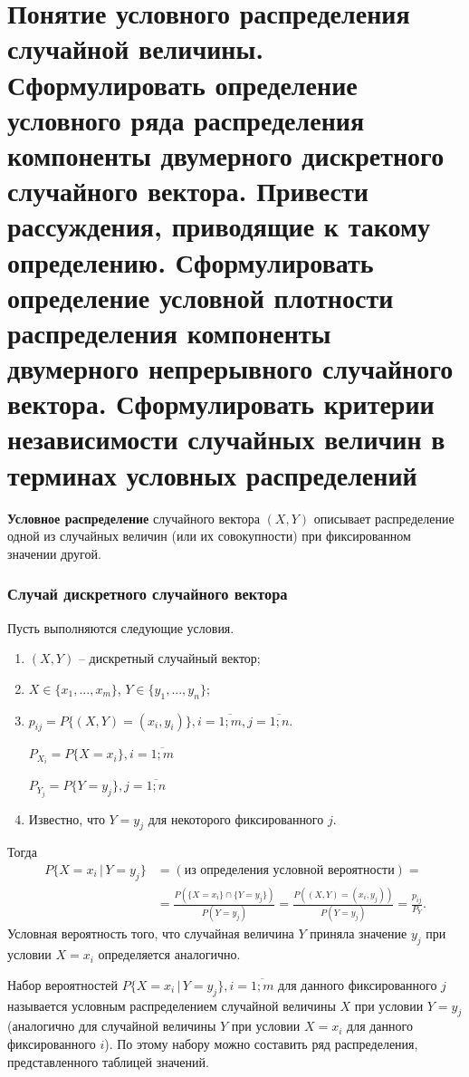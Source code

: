 \section{Понятие условного распределения случайной величины. Сформулировать определение условного ряда распределения компоненты двумерного дискретного случайного вектора. Привести рассуждения, приводящие к такому определению. Сформулировать определение условной плотности распределения компоненты двумерного непрерывного случайного вектора. Сформулировать критерии независимости случайных величин в терминах условных распределений}

\textbf{Условное распределение} случайного вектора $(X, Y)$ описывает распределение одной из случайных величин (или их совокупности) при фиксированном значении другой.

\subsubsection*{Случай дискретного случайного вектора}

Пусть выполняются следующие условия.

\begin{enumerate}
	
	\item $(X,Y)$ -- дискретный случайный вектор;
	\item $X \in \{x_1, ..., x_m\}$, $Y \in \{y_1, ..., y_n\}$;
	\item $p_{ij} = P\{(X,Y) = (x_i, y_i)\}, i = \overline{1; m}, j = \overline{1; n}$.
	
	$P_{X_i} = P\{X = x_i\}, i = \overline{1; m}$
	
	$P_{Y_j} = P\{Y = y_j\}, j = \overline{1; n}$
	
	\item Известно, что $Y = y_j$ для некоторого фиксированного $j$.
\end{enumerate}
Тогда 
\begin{align*}
	P\{X = x_i \,|\, Y = y_j\} &= 
	\left( \text{из определения условной вероятности} \right) = \\
	&= \frac{P(\{X = x_i\} \cap \{Y = y_j\})}{P(Y = y_j)} = 
	\frac{P((X, Y) = (x_i, y_j))}{P(Y = y_j)} = 
	\frac{p_{ij}}{P_Y}.
\end{align*}
Условная вероятность того, что случайная величина $Y$ приняла значение $y_j$ при условии $X = x_i$ определяется аналогично.

Набор вероятностей $P\{X = x_i \,|\, Y = y_j\}, i = \overline{1; m}$ для данного фиксированного $j$ называется условным распределением случайной величины $X$ при условии $Y = y_j$ (аналогично для случайной величины $Y$ при условии $X = x_i$ для данного фиксированного $i$). По этому набору можно составить ряд распределения, представленного таблицей значений.

